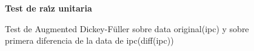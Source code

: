 \begin{figure}[h]
	\centering
	\textbf{Test de ra\'{\i}z unitaria}\par\medskip
	\caption{Test de Augmented Dickey-Füller sobre data original(ipc) y sobre primera diferencia de la data de ipc(diff(ipc))}\label{fig21}
\end{figure}

